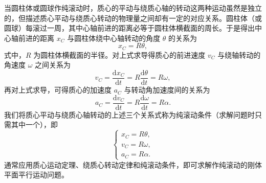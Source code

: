     当圆柱体或圆球作纯滚动时，质心的平动与绕质心轴的转动这两种运动虽然是独立的，但描述质心平动与绕质心转动的物理量之间却有一定的对应关系。圆柱体（或圆球）每滚过一周，其中心轴前进的距离必等于圆柱体横截面的周长。于是得出中心轴前进的距离 $x_C$ 与圆柱体绕中心轴转动的角度 $\theta$ 的关系为
    \[
    x_C=R\theta,
    \]
    式中，$R$ 为圆柱体横截面的半径。对上式求导得质心的前进速度 $v_C$ 与绕轴转动的角速度 $\omega$ 之间关系为
    \[
    v_C=\frac{\mathrm{d}x_C}{\mathrm{d}t}=R\frac{\mathrm{d}\theta}{\mathrm{d}t}=R\omega,
    \]
    再对上式求导，可得质心的加速度 $a_C$ 与转动角加速度间的关系为
    \[
    a_C=\frac{\mathrm{d}v_C}{\mathrm{d}t}=R\frac{\mathrm{d}\omega}{\mathrm{d}t}=R\alpha.
    \]
    我们将质心平动与绕质心轴转动的上述三个关系式称为纯滚动条件（求解问题时只需其中一个），即
    \[
    \begin{cases}
    x_C=R\theta,\\
    v_C=R\omega,\\
    a_C=R\alpha.
    \end{cases}
    \]
    通常应用质心运动定理、绕质心转动定律和纯滚动条件，即可求解作纯滚动的刚体平面平行运动问题。
